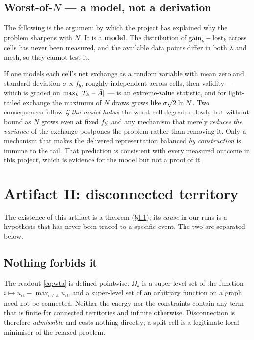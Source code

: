 \documentclass[11pt,a4paper]{article}
\begin{document}
\subsection{Worst-of-$N$ --- a model, not a derivation}

\begin{remark}
The following is the argument by which the project has explained why the problem
sharpens with $N$. It is a \textbf{model}. The distribution of $\mathrm{gain}_k - \mathrm{lost}_k$
across cells has never been measured, and the available data points differ in both
$\lambda$ and mesh, so they cannot test it.
\end{remark}

If one models each cell's net exchange as a random variable with mean zero and
standard deviation $\sigma \propto f_b$, roughly independent across cells, then
validity --- which is graded on $\max_k |T_k - \bar{A}|$ --- is an extreme-value
statistic, and for light-tailed exchange the maximum of $N$ draws grows like
$\sigma\sqrt{2\ln N}$. Two consequences follow \emph{if the model holds}: the worst
cell degrades slowly but without bound as $N$ grows even at fixed $f_b$; and any
mechanism that merely \emph{reduces the variance} of the exchange postpones the
problem rather than removing it. Only a mechanism that makes the delivered
representation balanced \emph{by construction} is immune to the tail. That
prediction is consistent with every measured outcome in this project, which is
evidence for the model but not a proof of it.

\section{Artifact II: disconnected territory}
\label{sec:artifact2}

\begin{remark}
The existence of this artifact is a theorem (\S\ref{sec:disc-possible}); its
\emph{cause} in our runs is a hypothesis that has never been traced to a specific
event. The two are separated below.
\end{remark}

\subsection{Nothing forbids it}
\label{sec:disc-possible}

The readout \eqref{eq:wta} is defined pointwise. $\Omega_k$ is a super-level set
of the function $i \mapsto u_{ik} - \max_{l \neq k} u_{il}$, and a super-level set
of an arbitrary function on a graph need not be connected. Neither the energy nor
the constraints contain any term that is finite for connected territories and
infinite otherwise. Disconnection is therefore \emph{admissible} and costs nothing
directly; a split cell is a legitimate local minimiser of the relaxed problem.
\end{document}
